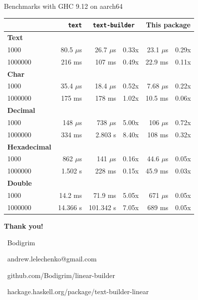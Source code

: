 \documentclass[handout]{beamer}
\begin{document}
\begin{frame}[fragile]{Benchmarks with GHC 9.12 on aarch64}

\begin{longtable}[]{@{}lrrrrr@{}}
~ & \texttt{text} & \multicolumn{2}{c}{\texttt{text-builder}} & \multicolumn{2}{c}{This package}
\\
\endhead
\endlastfoot
\textbf{Text} & & & & & \\
1000 & 80.5 $\mu$s & 26.7 $\mu$s & 0.33x & 23.1 $\mu$s & 0.29x \\
1000000 & 216 ms & 107 ms & 0.49x & 22.9 ms & 0.11x \\
\textbf{Char} & & & & & \\
1000 & 35.4 $\mu$s & 18.4 $\mu$s & 0.52x & 7.68 $\mu$s & 0.22x \\
1000000 & 175 ms & 178 ms & 1.02x & 10.5 ms & 0.06x \\
\textbf{Decimal} & & & & & \\
1000 & 148 $\mu$s & 738 $\mu$s & 5.00x & 106 $\mu$s & 0.72x \\
1000000 & 334 ms & 2.803 s & 8.40x & 108 ms & 0.32x \\
\textbf{Hexadecimal} & & & & & \\
1000 & 862 $\mu$s & 141 $\mu$s & 0.16x & 44.6 $\mu$s & 0.05x \\
1000000 & 1.502 s & 228 ms & 0.15x & 45.9 ms & 0.03x \\
\textbf{Double} & & & & & \\
1000 & 14.2 ms & 71.9 ms & 5.05x & 671 $\mu$s & 0.05x \\
1000000 & 14.366 s & 101.342 s & 7.05x & 689 ms & 0.05x \\
\end{longtable}

\end{frame}


\begin{frame}[fragile]


\begin{block}{}
\bigskip
\centerline{\Huge\bf \color{ukraine-blue} Thank you!}
\bigskip
\end{block}

\bigskip
\bigskip
\bigskip

\centerline{\color{ukraine-blue}
\faTelegram\ Bodigrim
}

\medskip

\centerline{\color{ukraine-blue}
\faAt\ andrew.lelechenko@gmail.com
}

\medskip

\centerline{\color{ukraine-blue}
\faGithub\ github.com/Bodigrim/linear-builder
}

\medskip

\centerline{\color{ukraine-blue}
\haskelllogo[splitlambda,scale=0.12,
first rangle color=ukraine-blue,
lambda color=ukraine-blue,
upper equals color=ukraine-blue,
lower equals color=ukraine-blue
]\
hackage.haskell.org/package/text-builder-linear
}

\end{frame}
\end{document}
